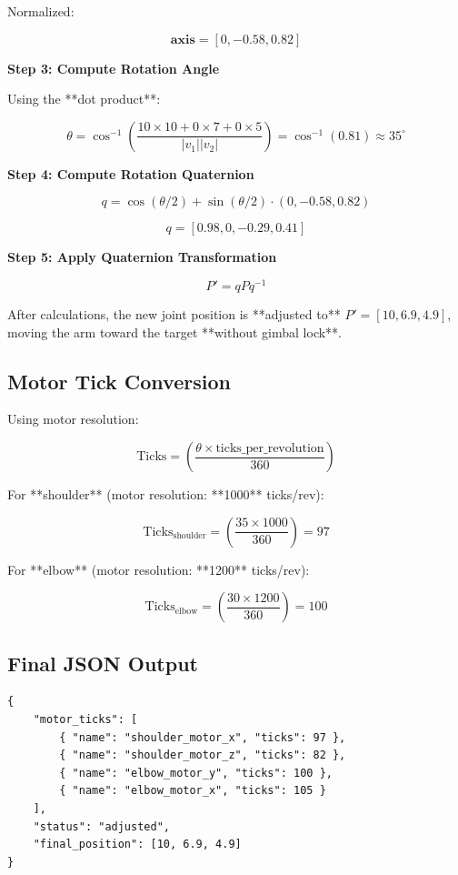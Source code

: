 \documentclass{article}
\begin{document}
Normalized:



\[
\mathbf{axis} = [0, -0.58, 0.82]
\]



\textbf{Step 3: Compute Rotation Angle}

Using the **dot product**:



\[
\theta = \cos^{-1} \left( \frac{10 \times 10 + 0 \times 7 + 0 \times 5}{|v_1| |v_2|} \right) = \cos^{-1} (0.81) \approx 35^\circ
\]



\textbf{Step 4: Compute Rotation Quaternion}



\[
q = \cos(\theta/2) + \sin(\theta/2) \cdot (0, -0.58, 0.82)
\]





\[
q = [0.98, 0, -0.29, 0.41]
\]



\textbf{Step 5: Apply Quaternion Transformation}



\[
P' = q P q^{-1}
\]



After calculations, the new joint position is **adjusted to** \( P' = [10, 6.9, 4.9] \), moving the arm toward the target **without gimbal lock**.

\subsection{Motor Tick Conversion}
Using motor resolution:



\[
\mathrm{Ticks} = \left(\frac{\theta \times \text{ticks\_per\_revolution}}{360} \right)
\]



For **shoulder** (motor resolution: **1000** ticks/rev):



\[
\mathrm{Ticks}_{\text{shoulder}} = \left(\frac{35 \times 1000}{360} \right) = 97
\]



For **elbow** (motor resolution: **1200** ticks/rev):



\[
\mathrm{Ticks}_{\text{elbow}} = \left(\frac{30 \times 1200}{360} \right) = 100
\]



\subsection{Final JSON Output}
\begin{verbatim}
{
    "motor_ticks": [
        { "name": "shoulder_motor_x", "ticks": 97 },
        { "name": "shoulder_motor_z", "ticks": 82 },
        { "name": "elbow_motor_y", "ticks": 100 },
        { "name": "elbow_motor_x", "ticks": 105 }
    ],
    "status": "adjusted",
    "final_position": [10, 6.9, 4.9]
}
\end{verbatim}
\end{document}
